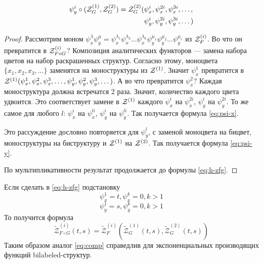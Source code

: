 \begin{equation}
\label{eq:psi-y}
\begin{split}
\psi_y^i \circ (\mathcal Z^{(1)}_G, \mathcal Z^{(2)}_G ) = \mathcal Z^{(2)}_G
(&\psi_x^i, \psi_x^{2i}, \psi_x^{3i}, \dots, \\
&\psi_y^i, \psi_y^{2i}, \psi_y^{3i}, \dots)
\end{split}
\end{equation}

\begin{proof}
Рассмотрим моном $\psi_x^{\lambda}\psi_y^{\mu} =
\psi_x^{\lambda_1}\psi_x^{\lambda_2}\ldots\psi_x^{\lambda_k}\psi_y^{\mu_1}\psi_y^{\mu_2}\ldots\psi_y^{\mu_r}$
из $\mathcal Z^{(i)}_{F}$. Во что он превратится в $\mathcal Z^{(i)}_{F \circ G}$? Композиция
аналитических функторов --- замена набора цветов на набор раскрашенных
структур.
Согласно этому, моноцвета $\{x_1, x_2, x_3, \ldots\}$ заменятся на
моноструктуры из $\mathcal Z^{(1)}$. Значит $\psi_x^1$ превратится в $\mathcal Z^{(1)}(\psi_x^1,
\psi_x^2, \psi_x^3, \dots, \psi_y^1, \psi_y^2, \psi_y^3, \dots)$. А во что
превратится $\psi_x^2$? Каждая моноструктура должна встречатся 2 раза.
Значит, количество каждого цвета удвоится. Это соответствует замене в $\mathcal Z^{(1)}$
каждого $\psi_x^i$ на $\psi_x^{2i}$, $\psi_y^i$ на $\psi_y^{2i}$. То же самое
для любого $l$: $\psi_x^i$ на $\psi_x^{li}$, $\psi_y^i$ на
$\psi_y^{li}$. Так получается формула \ref{eq:psi-x}.

Это рассуждение дословно повторяется для $\psi_y^l$, с заменой моноцвета на
бицвет, моноструктуры на биструктуру и $\mathcal Z^{(1)}$ на $\mathcal Z^{(2)}$. Так получается
формула \ref{eq:psi-y}.

По мультипликативности результат продолжается до формулы \ref{eq:h-zfg}.
\end{proof}

\begin{remark}
Если сделать в \ref{eq:h-zfg} подстановку 
$$
\psi_{x}^1 = t, \psi_{x}^k = 0, k>1
$$
$$
\psi_y^1 = s, \psi_y^k = 0, k>1
$$
То получится формула
$$
\tilde{\mathcal Z}^{(i)}_{F \circ G} (t, s) = 
	\tilde{\mathcal Z}_F^{(i)} (
		\tilde{\mathcal Z}_G^{(1)} (t, s), 
		\tilde{\mathcal Z}_G^{(2)} (t, s))
$$
Таким образом аналог \ref{eq:comp} справедлив для
экспоненциальных производящих функций bilabeled-структур.
\end{remark}

